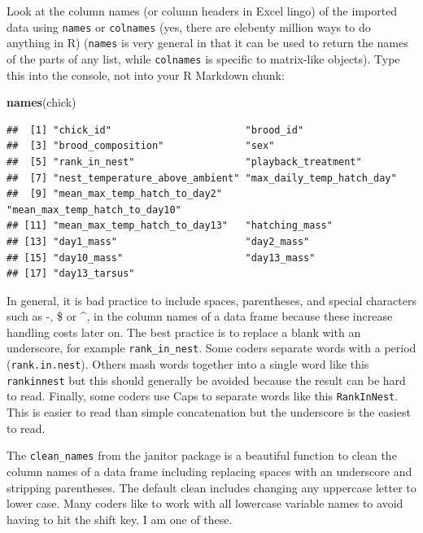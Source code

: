 \documentclass[]{book}
\newenvironment{Shaded}{\begin{snugshade}}{\end{snugshade}}
\newcommand{\KeywordTok}[1]{\textcolor[rgb]{0.13,0.29,0.53}{\textbf{#1}}}
\newcommand{\NormalTok}[1]{#1}
\begin{document}
Look at the column names (or column headers in Excel lingo) of the imported data using \texttt{names} or \texttt{colnames} (yes, there are elebenty million ways to do anything in R) (\texttt{names} is very general in that it can be used to return the names of the parts of any list, while \texttt{colnames} is specific to matrix-like objects). Type this into the console, not into your R Markdown chunk:

\begin{Shaded}
\begin{Highlighting}[]
\KeywordTok{names}\NormalTok{(chick)}
\end{Highlighting}
\end{Shaded}

\begin{verbatim}
##  [1] "chick_id"                       "brood_id"                      
##  [3] "brood_composition"              "sex"                           
##  [5] "rank_in_nest"                   "playback_treatment"            
##  [7] "nest_temperature_above_ambient" "max_daily_temp_hatch_day"      
##  [9] "mean_max_temp_hatch_to_day2"    "mean_max_temp_hatch_to_day10"  
## [11] "mean_max_temp_hatch_to_day13"   "hatching_mass"                 
## [13] "day1_mass"                      "day2_mass"                     
## [15] "day10_mass"                     "day13_mass"                    
## [17] "day13_tarsus"
\end{verbatim}

In general, it is bad practice to include spaces, parentheses, and special characters such as -, \$ or \^{}, in the column names of a data frame because these increase handling costs later on. The best practice is to replace a blank with an underscore, for example \texttt{rank\_in\_nest}. Some coders separate words with a period (\texttt{rank.in.nest}). Others mash words together into a single word like this \texttt{rankinnest} but this should generally be avoided because the result can be hard to read. Finally, some coders use Caps to separate words like this \texttt{RankInNest}. This is easier to read than simple concatenation but the underscore is the easiest to read.

The \texttt{clean\_names} from the janitor package is a beautiful function to clean the column names of a data frame including replacing spaces with an underscore and stripping parentheses. The default clean includes changing any uppercase letter to lower case. Many coders like to work with all lowercase variable names to avoid having to hit the shift key. I am one of these.
\end{document}
